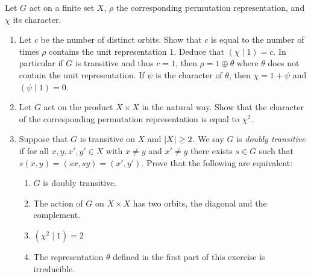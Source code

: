 \documentclass[letterpaper, 11pt, oneside]{book}
\begin{document}
\begin{exercise}
  Let $G$ act on a finite set $X$, $\rho$ the corresponding permutation representation, and $\chi$ its character.
  \begin{enumerate}
  \item Let $c$ be the number of distinct orbits.
        Show that $c$ is equal to the number of times $\rho$ contains the unit representation $1$.
        Deduce that $(\chi \mid 1) = c$.
        In particular if $G$ is transitive and thus $c = 1$, then $\rho = 1 \oplus \theta$ where $\theta$ does not contain the unit representation.
        If $\psi$ is the character of $\theta$, then $\chi = 1 + \psi$ and $(\psi \mid 1) = 0$.
  \item Let $G$ act on the product $X \times X$ in the natural way.
        Show that the character of the corresponding permutation representation is equal to $\chi^{2}$.
  \item Suppose that $G$ is transitive on $X$ and $\abs{X} \geq 2$.
        We say $G$ is \emph{doubly transitive} if for all $x, y, x', y' \in X$ with $x \neq y$ and $x' \neq y$ there exists $s \in G$ such that $s(x, y) = (sx, sy) = (x', y')$.
        Prove that the following are equivalent:
        \clearpage
        \begin{enumerate}
        \item $G$ is doubly transitive.
        \item The action of $G$ on $X \times X$ has two orbits, the diagonal and the complement.
        \item $(\chi^{2} \mid 1) = 2$
        \item The representation $\theta$ defined in the first part of this exercise is irreducible.
        \end{enumerate}
  \end{enumerate}
\end{exercise}
\end{document}
